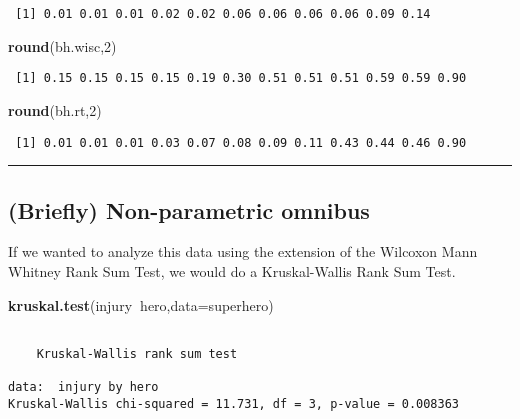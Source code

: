 \documentclass[]{article}
\newenvironment{Shaded}{\begin{snugshade}}{\end{snugshade}}
\newcommand{\DataTypeTok}[1]{\textcolor[rgb]{0.13,0.29,0.53}{#1}}
\newcommand{\DecValTok}[1]{\textcolor[rgb]{0.00,0.00,0.81}{#1}}
\newcommand{\KeywordTok}[1]{\textcolor[rgb]{0.13,0.29,0.53}{\textbf{#1}}}
\newcommand{\NormalTok}[1]{#1}
\newcommand{\OperatorTok}[1]{\textcolor[rgb]{0.81,0.36,0.00}{\textbf{#1}}}
\begin{document}
\begin{verbatim}
 [1] 0.01 0.01 0.01 0.02 0.02 0.06 0.06 0.06 0.06 0.09 0.14
\end{verbatim}

\begin{Shaded}
\begin{Highlighting}[]
\KeywordTok{round}\NormalTok{(bh.wisc,}\DecValTok{2}\NormalTok{)}
\end{Highlighting}
\end{Shaded}

\begin{verbatim}
 [1] 0.15 0.15 0.15 0.15 0.19 0.30 0.51 0.51 0.51 0.59 0.59 0.90
\end{verbatim}

\begin{Shaded}
\begin{Highlighting}[]
\KeywordTok{round}\NormalTok{(bh.rt,}\DecValTok{2}\NormalTok{)}
\end{Highlighting}
\end{Shaded}

\begin{verbatim}
 [1] 0.01 0.01 0.01 0.03 0.07 0.08 0.09 0.11 0.43 0.44 0.46 0.90
\end{verbatim}

\begin{center}\rule{0.5\linewidth}{\linethickness}\end{center}

\hypertarget{briefly-non-parametric-omnibus}{%
\subsection{(Briefly) Non-parametric
omnibus}\label{briefly-non-parametric-omnibus}}

If we wanted to analyze this data using the extension of the Wilcoxon
Mann Whitney Rank Sum Test, we would do a Kruskal-Wallis Rank Sum Test.

\begin{Shaded}
\begin{Highlighting}[]
\KeywordTok{kruskal.test}\NormalTok{(injury}\OperatorTok{~}\NormalTok{hero,}\DataTypeTok{data=}\NormalTok{superhero)}
\end{Highlighting}
\end{Shaded}

\begin{verbatim}

    Kruskal-Wallis rank sum test

data:  injury by hero
Kruskal-Wallis chi-squared = 11.731, df = 3, p-value = 0.008363
\end{verbatim}
\end{document}

